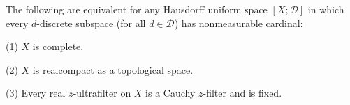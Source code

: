 The following are equivalent for any Hausdorff uniform space $[X; \mathcal{D}]$ in which every $d$-discrete subspace (for all $d \in \mathcal{D}$) has nonmeasurable cardinal:

(1) $X$ is complete.

(2) $X$ is realcompact as a topological space.

(3) Every real $z$-ultrafilter on $X$ is a Cauchy $z$-filter and is fixed.
